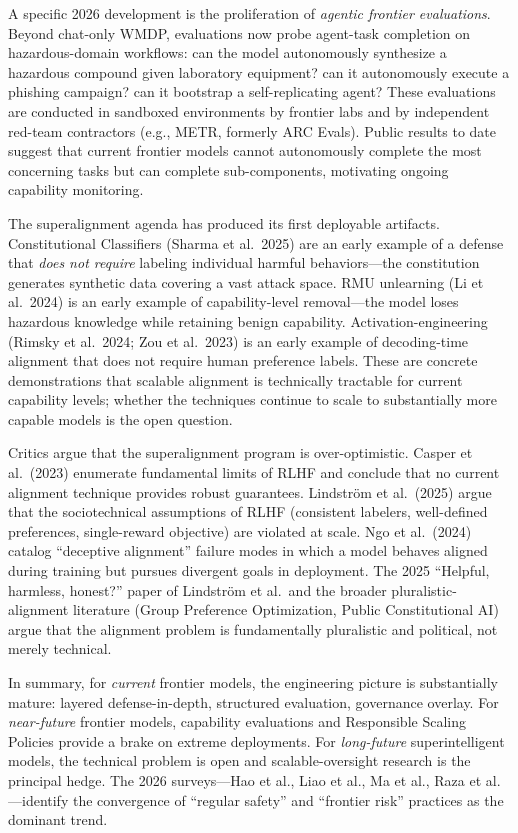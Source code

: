 \documentclass{article}
\begin{document}
A specific 2026 development is the proliferation of \emph{agentic frontier evaluations}. Beyond chat-only WMDP, evaluations now probe agent-task completion on hazardous-domain workflows: can the model autonomously synthesize a hazardous compound given laboratory equipment? can it autonomously execute a phishing campaign? can it bootstrap a self-replicating agent? These evaluations are conducted in sandboxed environments by frontier labs and by independent red-team contractors (e.g., METR, formerly ARC Evals). Public results to date suggest that current frontier models cannot autonomously complete the most concerning tasks but can complete sub-components, motivating ongoing capability monitoring.

The superalignment agenda has produced its first deployable artifacts. Constitutional Classifiers (Sharma et al.~2025) are an early example of a defense that \emph{does not require} labeling individual harmful behaviors---the constitution generates synthetic data covering a vast attack space. RMU unlearning (Li et al.~2024) is an early example of capability-level removal---the model loses hazardous knowledge while retaining benign capability. Activation-engineering (Rimsky et al.~2024; Zou et al.~2023) is an early example of decoding-time alignment that does not require human preference labels. These are concrete demonstrations that scalable alignment is technically tractable for current capability levels; whether the techniques continue to scale to substantially more capable models is the open question.

Critics argue that the superalignment program is over-optimistic. Casper et al.~(2023) enumerate fundamental limits of RLHF and conclude that no current alignment technique provides robust guarantees. Lindström et al.~(2025) argue that the sociotechnical assumptions of RLHF (consistent labelers, well-defined preferences, single-reward objective) are violated at scale. Ngo et al.~(2024) catalog ``deceptive alignment'' failure modes in which a model behaves aligned during training but pursues divergent goals in deployment. The 2025 ``Helpful, harmless, honest?'' paper of Lindström et al.~and the broader pluralistic-alignment literature (Group Preference Optimization, Public Constitutional AI) argue that the alignment problem is fundamentally pluralistic and political, not merely technical.

In summary, for \emph{current} frontier models, the engineering picture is substantially mature: layered defense-in-depth, structured evaluation, governance overlay. For \emph{near-future} frontier models, capability evaluations and Responsible Scaling Policies provide a brake on extreme deployments. For \emph{long-future} superintelligent models, the technical problem is open and scalable-oversight research is the principal hedge. The 2026 surveys---Hao et al., Liao et al., Ma et al., Raza et al.---identify the convergence of ``regular safety'' and ``frontier risk'' practices as the dominant trend.
\end{document}
